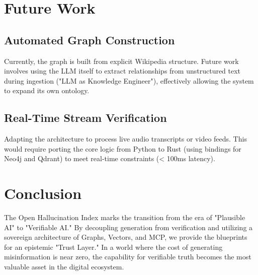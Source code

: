 \documentclass[10pt, a4paper, twocolumn]{article}
\begin{document}
\section{Future Work}

\subsection{Automated Graph Construction}
Currently, the graph is built from explicit Wikipedia structure. Future work involves using the LLM itself to extract relationships from unstructured text during ingestion ("LLM as Knowledge Engineer"), effectively allowing the system to expand its own ontology.

\subsection{Real-Time Stream Verification}
Adapting the architecture to process live audio transcripts or video feeds. This would require porting the core logic from Python to Rust (using bindings for Neo4j and Qdrant) to meet real-time constraints (< 100ms latency).

\section{Conclusion}
The Open Hallucination Index marks the transition from the era of "Plausible AI" to "Verifiable AI." By decoupling generation from verification and utilizing a sovereign architecture of Graphs, Vectors, and MCP, we provide the blueprints for an epistemic "Trust Layer." In a world where the cost of generating misinformation is near zero, the capability for verifiable truth becomes the most valuable asset in the digital ecosystem.
\end{document}
